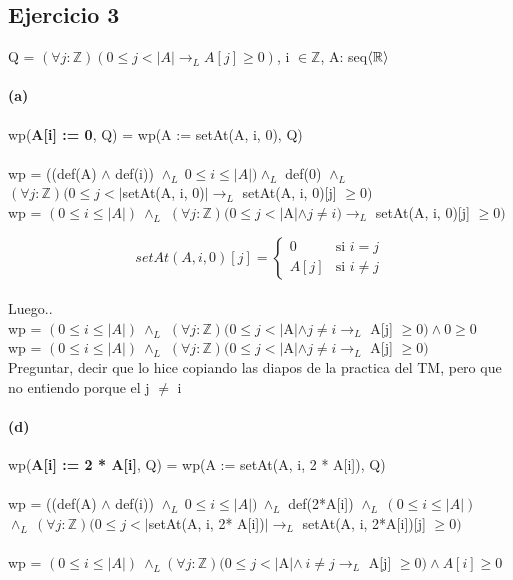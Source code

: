 \documentclass{article}
\begin{document}
\subsection{Ejercicio 3}
Q = \((\forall j:\mathbb{Z})(0 \leq j < |A| \rightarrow_L A[j] \geq 0) \), i \(\in \mathbb{Z}\), A: seq\(\braket{\mathbb{R}}\) 
\paragraph{(a)} wp(\textbf{A[i] := 0}, Q) =  wp(A := setAt(A, i, 0), Q)\\ \\
\setlength{\parindent}{32mm}\indent wp = ((def(A) \(\land\) def(i)) \(\land_L \: 0 \leq i \leq |A|)  \land_L\) def(0) \(\land_L\) \\ 
\setlength{\parindent}{42mm}\indent \((\forall j:\mathbb{Z})(0 \leq j < |\)setAt(A, i, 0)\(|  \rightarrow_L \) setAt(A, i, 0)[j] \(\geq 0) \) \\
\setlength{\parindent}{32mm}\indent wp = \((0 \leq i \leq |A|) \: \land_L\) \((\forall j:\mathbb{Z})(0 \leq j < |\)A\(| \land j \neq i)  \rightarrow_L \) setAt(A, i, 0)[j] \(\geq 0) \)

\[ 
       setAt(A, i, 0)[j] = \begin{cases} 0 & \text{si } i = j \\
                                        A[j] & \text{si } i \neq j 
                            \end{cases}
\]
\\
Luego.. \\
\setlength{\parindent}{32mm}\indent wp = \((0 \leq i \leq |A|) \: \land_L\) \((\forall j:\mathbb{Z})(0 \leq j < |\)A\(| \land j \neq i  \rightarrow_L \) A[j] \(\geq 0) \land 0 \geq 0\) \\
\setlength{\parindent}{32mm}\indent wp = \((0 \leq i \leq |A|) \: \land_L\) \((\forall j:\mathbb{Z})(0 \leq j < |\)A\(| \land j \neq i  \rightarrow_L \) A[j] \(\geq 0)\) \\


\setlength{\parindent}{0mm}\indent*Preguntar, decir que lo hice copiando las diapos de la practica del TM, pero que no entiendo porque el j \( \neq \) i

\paragraph{(d)} wp(\textbf{A[i] := 2 * A[i]}, Q) =  wp(A := setAt(A, i, 2 * A[i]), Q)\\ \\
\setlength{\parindent}{43mm}\indent wp = ((def(A) \(\land\) def(i)) \(\land_L \: 0 \leq i \leq |A|) \: \land_L\) def(2*A[i]) \(\land_L \: (0 \leq i \leq |A|)\)\\ 
\setlength{\parindent}{49mm}\indent \(\land_L \: (\forall j:\mathbb{Z})(0 \leq j < |\)setAt(A, i, 2* A[i])\(|  \rightarrow_L \) setAt(A, i, 2*A[i])[j] \(\geq 0) \) \\ \\
\setlength{\parindent}{43mm}\indent wp = \((0 \leq i \leq |A|) \: \land_L\)\( (\forall j:\mathbb{Z})(0 \leq j < |\)A\(|\land \:i \neq j  \rightarrow_L \) A[j] \(\geq 0) \land A[i] \geq 0\)  \\ 
\end{document}
